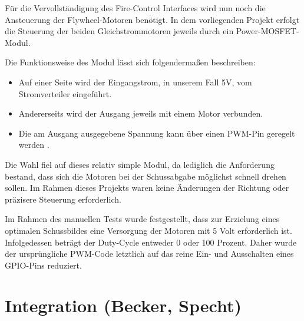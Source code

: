 Für die Vervollständigung des Fire-Control Interfaces wird nun noch die Ansteuerung der Flywheel-Motoren benötigt.
In dem vorliegenden Projekt erfolgt die Steuerung der beiden Gleichstrommotoren jeweils durch ein Power-MOSFET-Modul.

Die Funktionsweise des Modul lässt sich folgendermaßen beschreiben:

\begin{itemize}
    \item Auf einer Seite wird der Eingangstrom, in unserem Fall 5V, vom Stromverteiler eingeführt.
    \item Andererseits wird der Ausgang jeweils mit einem Motor verbunden.
    \item Die am Ausgang ausgegebene Spannung kann über einen PWM-Pin geregelt werden \cite{esp_platform_flywheel_motor}.
\end{itemize}

Die Wahl fiel auf dieses relativ simple Modul, da lediglich die Anforderung bestand, dass sich die Motoren bei der Schussabgabe möglichst schnell drehen sollen.
Im Rahmen dieses Projekts waren keine Änderungen der Richtung oder präzisere Steuerung erforderlich.

Im Rahmen des manuellen Tests wurde festgestellt, dass zur Erzielung eines optimalen Schussbildes eine Versorgung der Motoren mit 5 Volt erforderlich ist. 
Infolgedessen beträgt der Duty-Cycle entweder 0 oder 100 Prozent.
Daher wurde der ursprüngliche PWM-Code letztlich auf das reine Ein- und Ausschalten eines GPIO-Pins reduziert.

\section{Integration (Becker, Specht)}